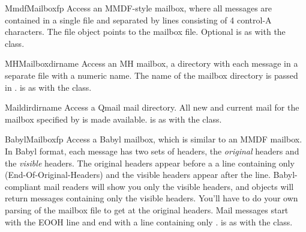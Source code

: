 \begin{classdesc}{MmdfMailbox}{fp}
Access an MMDF-style mailbox, where all messages are contained
in a single file and separated by lines consisting of 4 control-A
characters.  The file object  points to the mailbox file.
Optional  is as with the  class.
\end{classdesc}

\begin{classdesc}{MHMailbox}{dirname}
Access an MH mailbox, a directory with each message in a separate
file with a numeric name.
The name of the mailbox directory is passed in .
 is as with the  class.
\end{classdesc}

\begin{classdesc}{Maildir}{dirname}
Access a Qmail mail directory.  All new and current mail for the
mailbox specified by  is made available.
 is as with the  class.
\end{classdesc}

\begin{classdesc}{BabylMailbox}{fp}
Access a Babyl mailbox, which is similar to an MMDF mailbox.  In
Babyl format, each message has two sets of headers, the
\emph{original} headers and the \emph{visible} headers.  The original
headers appear before a a line containing only 
(End-Of-Original-Headers) and the visible headers appear after the
 line.  Babyl-compliant mail readers will show you only the
visible headers, and  objects will return messages
containing only the visible headers.  You'll have to do your own
parsing of the mailbox file to get at the original headers.  Mail
messages start with the EOOH line and end with a line containing only
.   is as with the
 class.
\end{classdesc}


\begin{seealso}
\end{seealso}


